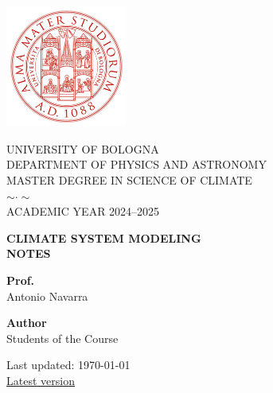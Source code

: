 \pagestyle{empty}


\titleformat{\section}[block]{\centering\bfseries\Large}{}{0pt}{}


\begin{titlepage}

	\setlength{\parindent}{0pt}

	\begin{center}
		\includegraphics[width=0.3\textwidth]{setup/unibo-red} %
	\end{center}

	\begin{center}
		\Large UNIVERSITY OF BOLOGNA \\[0.5em]
		\large DEPARTMENT OF PHYSICS AND ASTRONOMY \\[0.5em]
		\large MASTER DEGREE IN SCIENCE OF CLIMATE \\[1em]
		$\sim \cdot \sim$ \\[1em]
		\large ACADEMIC YEAR 2024--2025
	\end{center}

	\vfill

	\begin{center}
		{\LARGE \textbf{CLIMATE SYSTEM MODELING}} \\[0.5em]
		{\LARGE \textbf{NOTES}}
	\end{center}

	\vfill

	\noindent
	\begin{minipage}[t]{0.48\textwidth}
		\raggedright
		\textbf{Prof.} \\
		Antonio Navarra
	\end{minipage}%
	\hfill
	\begin{minipage}[t]{0.48\textwidth}
		\raggedleft
		\textbf{Author} \\
		Students of the Course \\

	\end{minipage}


	\vfill

	\begin{center}
		Last updated:
		\today \\
		\href{https://niccolozanotti.github.io/climate-modeling/notes.pdf}{Latest version}
	\end{center}

	\restoregeometry

\end{titlepage}


\titleformat{\section}[block]{\normalfont\Large\bfseries}{\thesection}{1em}{}



